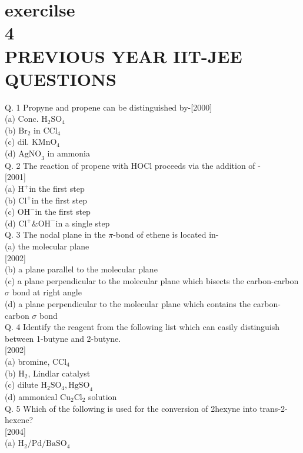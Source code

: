 \documentclass[10pt]{article}
\begin{document}
\section*{exercilse \\
 4 \\
 PREVIOUS YEAR IIT-JEE QUESTIONS}
Q. 1 Propyne and propene can be distinguished by-[2000]\\
(a) Conc. $\mathrm{H}_{2} \mathrm{SO}_{4}$\\
(b) $\mathrm{Br}_{2}$ in $\mathrm{CCl}_{4}$\\
(c) dil. $\mathrm{KMnO}_{4}$\\
(d) $\mathrm{AgNO}_{3}$ in ammonia\\
Q. 2 The reaction of propene with HOCl proceeds via the addition of -\\[0pt]
[2001]\\
(a) $\mathrm{H}^{+}$in the first step\\
(b) $\mathrm{Cl}^{+}$in the first step\\
(c) $\mathrm{OH}^{-}$in the first step\\
(d) $\mathrm{Cl}^{+} \& \mathrm{OH}^{-}$in a single step\\
Q. 3 The nodal plane in the $\pi$-bond of ethene is located in-\\
(a) the molecular plane\\[0pt]
[2002]\\
(b) a plane parallel to the molecular plane\\
(c) a plane perpendicular to the molecular plane which bisects the carbon-carbon $\sigma$ bond at right angle\\
(d) a plane perpendicular to the molecular plane which contains the carbon-carbon $\sigma$ bond\\
Q. 4 Identify the reagent from the following list which can easily distinguish between 1-butyne and 2-butyne.\\[0pt]
[2002]\\
(a) bromine, $\mathrm{CCl}_{4}$\\
(b) $\mathrm{H}_{2}$, Lindlar catalyst\\
(c) dilute $\mathrm{H}_{2} \mathrm{SO}_{4}, \mathrm{HgSO}_{4}$\\
(d) ammonical $\mathrm{Cu}_{2} \mathrm{Cl}_{2}$ solution\\
Q. 5 Which of the following is used for the conversion of 2hexyne into trans-2-hexene?\\[0pt]
[2004]\\
(a) $\mathrm{H}_{2} / \mathrm{Pd} / \mathrm{BaSO}_{4}$\\
\end{document}
